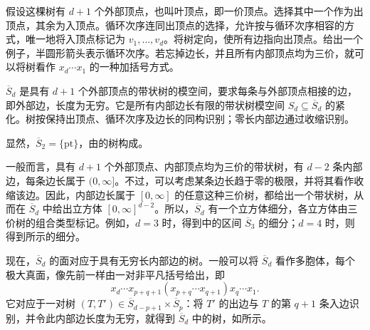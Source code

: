 假设这棵树有 $d+1$ 个外部顶点，也叫叶顶点，即一价顶点。选择其中一个作为出顶点，其余为入顶点。循环次序连同出顶点的选择，允许按与循环次序相容的方式，唯一地将入顶点标记为 $v_1,\ldots,v_d$。将树定向，使所有边指向出顶点。给出一个例子，半圆形箭头表示循环次序。若忘掉边长，并且所有内部顶点均为三价，就可以将树看作 $x_d\cdots x_1$ 的一种加括号方式。
\begin{figure}[H]
\centering
{}
\BookNumberOnlyCaption\label{fig:8.4}
\end{figure}

\begin{definition}\label{def:8.2}
$\overline S_d$ 是具有 $d+1$ 个外部顶点的带状树的模空间，要求每条与外部顶点相接的边，即外部边，长度为无穷。它是所有内部边长有限的带状树模空间 $S_d\subseteq\overline S_d$ 的紧化。树按保持出顶点、循环次序及边长的同构识别；零长内部边通过收缩识别。
\end{definition}

显然，$\overline S_2=\{\mathrm{pt}\}$，由的树构成。
\begin{figure}[H]
\centering
{}
\BookNumberOnlyCaption\label{fig:8.5}
\end{figure}
一般而言，具有 $d+1$ 个外部顶点、内部顶点均为三价的带状树，有 $d-2$ 条内部边，每条边长属于 $(0,\infty]$。不过，可以考虑某条边长趋于零的极限，并将其看作收缩该边。因此，内部边长属于 $[0,\infty]$ 的任意这种三价树，都给出一个带状树，从而在 $\overline S_d$ 中给出立方体 $[0,\infty]^{d-2}$。所以，$\overline S_d$ 有一个立方体细分，各立方体由三价树的组合类型标记。例如，$d=3$ 时，得到中的区间 $\overline S_3$ 的细分；$d=4$ 时，则得到所示的细分。
\begin{figure}[H]
\centering
{}
\BookNumberOnlyCaption\label{fig:8.6}
\end{figure}
\begin{figure}[H]
\centering
{}
\BookNumberOnlyCaption\label{fig:8.7}
\end{figure}

现在，$\overline S_d$ 的面对应于具有无穷长内部边的树。一般可以将 $\overline S_d$ 看作多胞体，每个极大真面，像先前一样由一对非平凡括号给出，即
\setcounter{equation}{0}
\begin{equation}\label{eq:8.1}
x_d\cdots x_{p+q+1}(x_{p+q}\cdots x_{q+1})x_q\cdots x_1.
\end{equation}
它对应于一对树 $(T,T')\in\overline S_{d-p+1}\times\overline S_p$：将 $T'$ 的出边与 $T$ 的第 $q+1$ 条入边识别，并令此内部边长度为无穷，就得到 $\overline S_d$ 中的树，如所示。
\begin{figure}[H]
\centering
{}
\BookNumberOnlyCaption\label{fig:8.8}
\end{figure}

